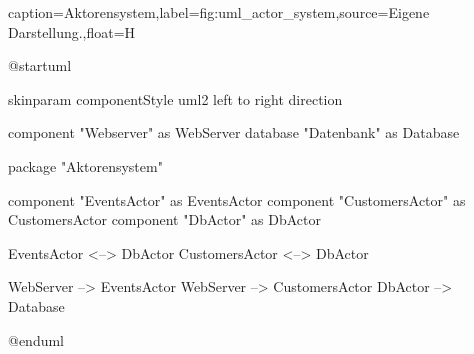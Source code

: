 \begin{dhbwfigure}{caption=Aktorensystem,label=fig:uml_actor_system,source={Eigene Darstellung.},float=H}
    \begin{plantuml}
        @startuml

            skinparam componentStyle uml2
            left to right direction

            component "Webserver" as WebServer
            database "Datenbank" as Database

            package "Aktorensystem" {
                component "EventsActor" as EventsActor
                component "CustomersActor" as CustomersActor
                component "DbActor" as DbActor

                EventsActor <--> DbActor
                CustomersActor <--> DbActor
            }

            WebServer --> EventsActor
            WebServer --> CustomersActor
            DbActor --> Database

        @enduml
    \end{plantuml}
\end{dhbwfigure}\unskip
